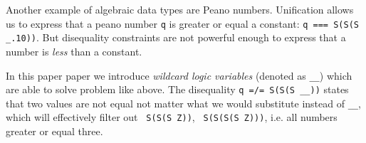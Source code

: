 Another example of algebraic data types are Peano numbers. Unification allows us to express that a peano number \lstinline|q| is greater or equal a constant: \lstinline|q === S(S(S _.10))|$\!\!$.
But disequality constraints are not powerful enough to express that a number is \emph{less} than a constant.

In this paper paper we introduce \emph{wildcard logic variables
} (denoted as \lstinline|__|) which are able to solve problem like above. 
The disequality \lstinline|q =/= S(S(S __))| states that two values are not equal not matter what we would substitute instead of \lstinline|__|, which will effectively filter out \lstinline| S(S(S Z))|, \lstinline| S(S(S(S Z)))|, i.e. all numbers greater or equal three.


